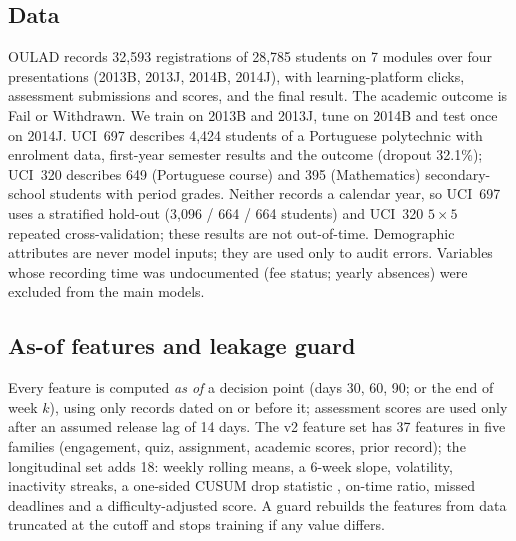 \documentclass[conference]{IEEEtran}
\begin{document}
\subsection{Data}
OULAD \cite{kuzilek2017} records 32,593 registrations of 28,785 students on 7 modules over four presentations
(2013B, 2013J, 2014B, 2014J), with learning-platform clicks, assessment submissions and scores, and the final result.
The academic outcome is Fail or Withdrawn. We train on 2013B and 2013J, tune on 2014B and test once on 2014J.
UCI~697 \cite{realinho2021} describes 4,424 students of a Portuguese polytechnic with enrolment data, first-year
semester results and the outcome (dropout 32.1\%); UCI~320 \cite{cortez2008} describes 649 (Portuguese course) and
395 (Mathematics) secondary-school students with period grades. Neither records a calendar year, so UCI~697 uses a
stratified hold-out (3,096 / 664 / 664 students) and UCI~320 $5\times5$ repeated cross-validation; these results
are not out-of-time. Demographic attributes are never model inputs; they
are used only to audit errors. Variables whose recording time was undocumented (fee status; yearly absences) were
excluded from the main models.

\subsection{As-of features and leakage guard}
Every feature is computed \emph{as of} a decision point (days 30, 60, 90; or the end of week $k$), using only
records dated on or before it; assessment scores are used only after an assumed release lag of 14 days. The v2
feature set has 37 features in five families (engagement, quiz, assignment, academic scores, prior record); the
longitudinal set adds 18: weekly rolling means, a 6-week slope, volatility, inactivity streaks, a one-sided CUSUM
drop statistic \cite{page1954}, on-time ratio, missed deadlines and a difficulty-adjusted score. A guard rebuilds
the features from data truncated at the cutoff and stops training if any value differs.
\end{document}

